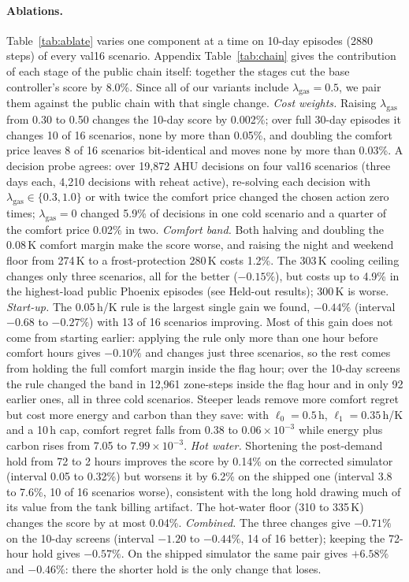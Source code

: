 \documentclass{article}
\begin{document}
\paragraph{Ablations.} Table~\ref{tab:ablate} varies one component at a time on 10-day episodes (2880 steps) of every val16 scenario. Appendix Table~\ref{tab:chain} gives the contribution of each stage of the public chain itself: together the stages cut the base controller's score by 8.0\%. Since all of our variants include $\lambda_{\mathrm{gas}}=0.5$, we pair them against the public chain with that single change. \emph{Cost weights.} Raising $\lambda_{\mathrm{gas}}$ from 0.30 to 0.50 changes the 10-day score by 0.002\%; over full 30-day episodes it changes 10 of 16 scenarios, none by more than 0.05\%, and doubling the comfort price leaves 8 of 16 scenarios bit-identical and moves none by more than 0.03\%. A decision probe agrees: over 19{,}872 AHU decisions on four val16 scenarios (three days each, 4{,}210 decisions with reheat active), re-solving each decision with $\lambda_{\mathrm{gas}} \in \{0.3, 1.0\}$ or with twice the comfort price changed the chosen action zero times; $\lambda_{\mathrm{gas}}=0$ changed 5.9\% of decisions in one cold scenario and a quarter of the comfort price 0.02\% in two. \emph{Comfort band.} Both halving and doubling the 0.08\,K comfort margin make the score worse, and raising the night and weekend floor from 274\,K to a frost-protection 280\,K costs 1.2\%. The 303\,K cooling ceiling changes only three scenarios, all for the better ($-0.15\%$), but costs up to 4.9\% in the highest-load public Phoenix episodes (see Held-out results); 300\,K is worse. \emph{Start-up.} The 0.05\,h/K rule is the largest single gain we found, $-0.44\%$ (interval $-0.68$ to $-0.27\%$) with 13 of 16 scenarios improving. Most of this gain does not come from starting earlier: applying the rule only more than one hour before comfort hours gives $-0.10\%$ and changes just three scenarios, so the rest comes from holding the full comfort margin inside the flag hour; over the 10-day screens the rule changed the band in 12{,}961 zone-steps inside the flag hour and in only 92 earlier ones, all in three cold scenarios. Steeper leads remove more comfort regret but cost more energy and carbon than they save: with $\ell_0=0.5$\,h, $\ell_1=0.35$\,h/K and a 10\,h cap, comfort regret falls from 0.38 to $0.06\times10^{-3}$ while energy plus carbon rises from 7.05 to $7.99\times10^{-3}$. \emph{Hot water.} Shortening the post-demand hold from 72 to 2 hours improves the score by 0.14\% on the corrected simulator (interval 0.05 to 0.32\%) but worsens it by 6.2\% on the shipped one (interval 3.8 to 7.6\%, 10 of 16 scenarios worse), consistent with the long hold drawing much of its value from the tank billing artifact. The hot-water floor (310 to 335\,K) changes the score by at most 0.04\%. \emph{Combined.} The three changes give $-0.71\%$ on the 10-day screens (interval $-1.20$ to $-0.44\%$, 14 of 16 better); keeping the 72-hour hold gives $-0.57\%$. On the shipped simulator the same pair gives $+6.58\%$ and $-0.46\%$: there the shorter hold is the only change that loses.
\end{document}
